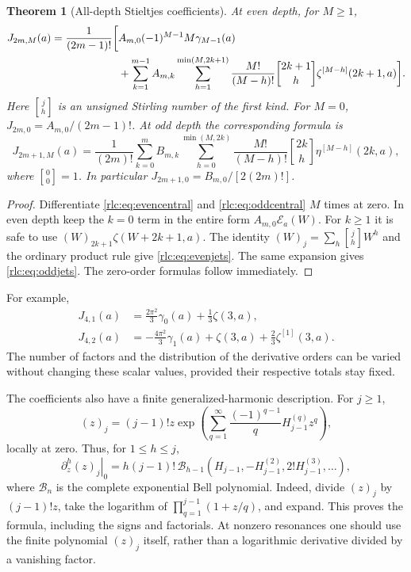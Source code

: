 \documentclass[11pt,a4paper]{article}
\numberwithin{equation}{section}
\newtheorem{theorem}{Theorem}[section]
\theoremstyle{definition}\newtheorem{definition}[theorem]{Definition}
\theoremstyle{remark}\newtheorem{remark}[theorem]{Remark}
\newcommand{\E}{\mathcal E}
\newcommand{\stir}[2]{\genfrac{[}{]}{0pt}{}{#1}{#2}}
\begin{document}
\begin{theorem}[All-depth Stieltjes coefficients]
\label{rlc:thm:alljets}
At even depth, for $M\ge1$,
\begin{align}
 J_{2m,M}(a)=\frac1{(2m-1)!}\biggl[&
 A_{m,0}(-1)^{M-1}M\gamma_{M-1}(a)\notag\\
 &+\sum_{k=1}^{m-1}A_{m,k}
 \sum_{h=1}^{\min(M,2k+1)}
 \frac{M!}{(M-h)!}\stir{2k+1}{h}
       \zeta^{[M-h]}(2k+1,a)\biggr].
 \label{rlc:eq:evenjets}
\end{align}
Here $\stir{j}{h}$ is an unsigned Stirling number of the first kind.
For $M=0$, $J_{2m,0}=A_{m,0}/(2m-1)!$.
At odd depth the corresponding formula is
\begin{equation}\label{rlc:eq:oddjets}
 J_{2m+1,M}(a)=\frac1{(2m)!}
 \sum_{k=0}^{m}B_{m,k}
 \sum_{h=0}^{\min(M,2k)}
 \frac{M!}{(M-h)!}\stir{2k}{h}
          \eta^{[M-h]}(2k,a),
\end{equation}
where $\stir00=1$. In particular $J_{2m+1,0}=B_{m,0}/[2(2m)!]$.
\end{theorem}
\begin{proof}
Differentiate \eqref{rlc:eq:evencentral} and
\eqref{rlc:eq:oddcentral} $M$ times at zero. In even depth keep the
$k=0$ term in the entire form $A_{m,0}\E_a(W)$. For $k\ge1$ it is
safe to use $(W)_{2k+1}\zeta(W+2k+1,a)$.
The identity $(W)_j=\sum_h\stir jh W^h$ and the ordinary product rule
give \eqref{rlc:eq:evenjets}. The same expansion gives
\eqref{rlc:eq:oddjets}. The zero-order formulas follow immediately.
\end{proof}

For example,
\begin{align}
 J_{4,1}(a)&=\frac{2\pi^2}{3}\gamma_0(a)+\frac13\zeta(3,a),
 \label{rlc:eq:J41}\\
 J_{4,2}(a)&=-\frac{4\pi^2}{3}\gamma_1(a)
              +\zeta(3,a)+\frac23\zeta^{[1]}(3,a).
 \label{rlc:eq:J42}
\end{align}
The number of factors and the distribution of the derivative orders
can be varied without changing these scalar values, provided their
respective totals stay fixed.

The coefficients also have a finite generalized-harmonic description.
For $j\ge1$,
\begin{equation}\label{rlc:eq:pochhammerharmonic}
 (z)_j=(j-1)!z\exp\left(
 \sum_{q=1}^\infty\frac{(-1)^{q-1}}q H_{j-1}^{(q)}z^q\right),
\end{equation}
locally at zero. Thus, for $1\le h\le j$,
\begin{equation}\label{rlc:eq:Bellharmonic}
 \left.\partial_z^h(z)_j\right|_{0}
 =h(j-1)!\,\mathcal B_{h-1}
 \left(H_{j-1},-H_{j-1}^{(2)},2!H_{j-1}^{(3)},\ldots\right),
\end{equation}
where $\mathcal B_n$ is the complete exponential Bell polynomial.
Indeed, divide $(z)_j$ by $(j-1)!z$, take the logarithm of
$\prod_{q=1}^{j-1}(1+z/q)$, and expand. This proves the formula,
including the signs and factorials. At nonzero resonances one should
use the finite polynomial $(z)_j$ itself, rather than a logarithmic
derivative divided by a vanishing factor.
\end{document}
